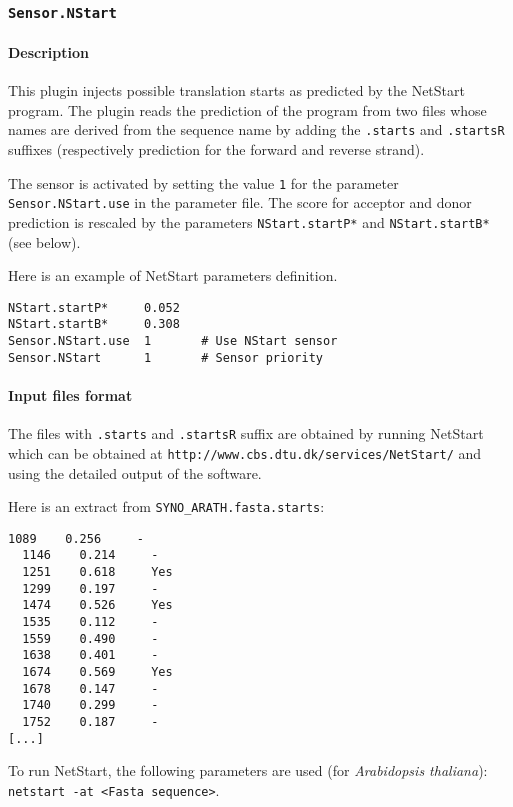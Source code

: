 
\subsubsection{\texttt{Sensor.NStart}}

\paragraph{Description}

This plugin injects possible translation starts as predicted by the
NetStart program. The plugin reads the prediction of the
program from two files whose names are derived from the sequence name
by adding the \texttt{.starts} and \texttt{.startsR} suffixes
(respectively prediction for the forward and reverse strand).

The sensor is activated by setting the value \texttt{1} for the parameter
\texttt{Sensor.NStart.use} in the parameter file. The score for acceptor
and donor prediction is rescaled by the parameters {\tt NStart.startP*} and
{\tt NStart.startB*} (see below).

Here is an example of NetStart parameters definition.
\begin{Verbatim}[fontsize=\small]
NStart.startP*     0.052
NStart.startB*     0.308
Sensor.NStart.use  1       # Use NStart sensor
Sensor.NStart      1       # Sensor priority
\end{Verbatim}

\paragraph{Input files format}

The files with \texttt{.starts} and \texttt{.startsR} suffix are
obtained by running NetStart which can be obtained at
\texttt{http://www.cbs.dtu.dk/services/NetStart/} and using the
detailed output of the software.

Here is an extract from \texttt{SYNO\_ARATH.fasta.starts}:
\begin{Verbatim}[fontsize=\small]
  1089    0.256     -
  1146    0.214     -
  1251    0.618     Yes
  1299    0.197     -
  1474    0.526     Yes
  1535    0.112     -
  1559    0.490     -
  1638    0.401     -
  1674    0.569     Yes
  1678    0.147     -
  1740    0.299     -
  1752    0.187     -
[...]
\end{Verbatim}

To run NetStart, the following parameters are used (for \emph{Arabidopsis
thaliana}): \texttt{netstart -at <Fasta sequence>}.

